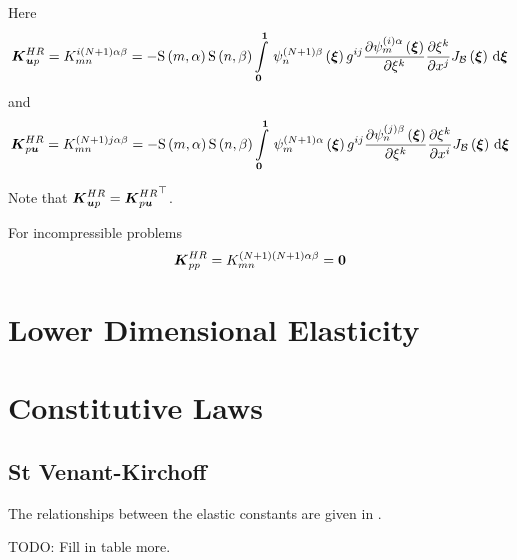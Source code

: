 Here
\begin{equation}
  \matr{K}^{HR}_{\vectr{u}p}=K^{i\pbrac{N+1}\alpha\beta}_{mn}=-\gsf{m}{\alpha}\gsf{n}{\beta}\gint{\vectr{0}}{\vectr{1}}{\idxgbfn{\pbrac{N+1}}{n}{\beta}{\vectr{\xi}}g^{ij}\delby{\idxgbfn{\pbrac{i}}{m}{\alpha}{\vectr{\xi}}}{\xi^{k}}\delby{\xi^{k}}{x^{j}}\fnof{J_{\embedmanifold{B}}}{\vectr{\xi}}}{\vectr{\xi}}
\end{equation}
and
\begin{equation}
  \matr{K}^{HR}_{p\vectr{u}}=K^{\pbrac{N+1}j\alpha\beta}_{mn}=-\gsf{m}{\alpha}\gsf{n}{\beta}\gint{\vectr{0}}{\vectr{1}}{\idxgbfn{\pbrac{N+1}}{m}{\alpha}{\vectr{\xi}}g^{ij}\delby{\idxgbfn{\pbrac{j}}{n}{\beta}{\vectr{\xi}}}{\xi^{k}}\delby{\xi^{k}}{x^{i}}\fnof{J_{\embedmanifold{B}}}{\vectr{\xi}}}{\vectr{\xi}}
\end{equation}

Note that $\matr{K}^{HR}_{\vectr{u}p}=\transpose{\matr{K}^{HR}_{p\vectr{u}}}$.

For incompressible problems
\begin{equation}
  \matr{K}^{HR}_{pp}=K^{\pbrac{N+1}\pbrac{N+1}\alpha\beta}_{mn}=\matr{0}
\end{equation}

\section{Lower Dimensional Elasticity}
\label{sec:FiniteMechLowerDimensions}

\section{Constitutive Laws}
\label{sec:FiniteMechConstitutiveLaws}

\subsection{St Venant-Kirchoff}

The relationships between the elastic constants are given in .

TODO: Fill in table more.

